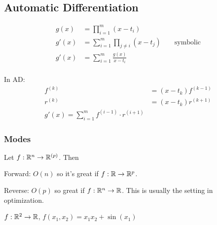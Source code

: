 \documentclass[class=article,crop=false]{standalone}
\begin{document}
\subsection{Automatic Differentiation}
\begin{eg}
\begin{align*}
	g(x) &= \prod_{i=1}^m (x-t_i)\\
	g'(x) &= \sum_{ i= 1}^{ m} \prod_{j\neq i}(x-t_j) && \text{ symbolic} \\
	g'(x) &= \sum_{ i= 1}^{ m} \frac{g(x)}{x-t_i } \\
\end{align*}

In AD:
\begin{align*}
	f^{(k)} &= (x-t_k) f^{(k-1)} \\
	r^{(k)} &= (x-t_k) r^{(k+1)} \\
	g'(x) = \sum_{ i= 1}^{ m} f^{(i-1)} \cdot r^{(i+1)}
\end{align*}
\end{eg}

\subsubsection{Modes}
Let $ f: \mathbb{R}^{n} \to \mathbb{R}^{(p)}$. Then

Forward: $ O(n)$ so it's great if  $ f:\mathbb{R} \to \mathbb{R}^{p}$.

Reverse: $ O(p)$ so great if  $ f: \mathbb{R}^{n} \to \mathbb{R}$. This is usually the setting in optimization.

\begin{eg}
	$ f: \mathbb{R}^{2} \to \mathbb{R}$, $ f(x_1, x_2) = x_1 x_2 + \sin(x_1)$
\end{eg}
\end{document}
